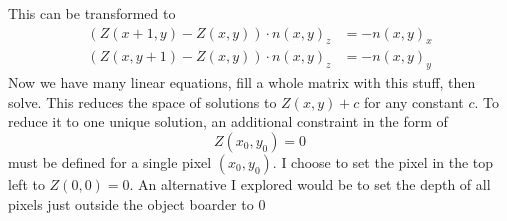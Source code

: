 \documentclass{paper}
\begin{document}
This can be transformed to
\begin{equation}
\begin{aligned}
	(Z(x+1,y) - Z(x,y)) \cdot n(x,y)_z &= -n(x,y)_x \\
	(Z(x,y+1) - Z(x,y)) \cdot n(x,y)_z &= -n(x,y)_y 
\end{aligned}
\end{equation}
Now we have many linear equations, fill a whole matrix with this stuff, then solve.
This reduces the space of solutions to $Z(x,y) + c$ for any constant $c$. To reduce
it to one unique solution, an additional constraint in the form of 
\begin{equation}
	Z(x_0, y_0) = 0
\end{equation}
must be defined for a single pixel $(x_0, y_0)$. I choose to set the pixel in the top left to $Z(0,0) = 0$. An alternative I explored 
would be to set the depth of all pixels just outside the object boarder to $0$
\end{document}

